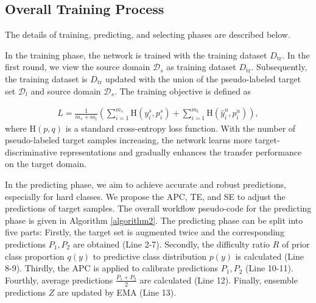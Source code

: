 \documentclass[a4paper,fleqn]{cas-dc}
\begin{document}
	\subsection{Overall Training Process}
	The details of training, predicting, and selecting phases are described below.
	
	In the training phase, the network is trained with the training dataset $D_{\text{tr}}$. In the first round, we view the source domain $\mathcal{D}_{s}$ as training dataset $D_{\text{tr}}$. Subsequently, the training dataset is $D_{\text{tr}}$ updated  with the union of the pseudo-labeled target set $\mathcal{D}_{l}$ and source domain $\mathcal{D}_{s}$. The training objective is defined as
	
	\begin{equation}
		\begin{aligned}
			L = \frac{1}{m_s+ m_t} (\sum_{i=1}^{m_s} \text{H}(y_i^s, p_i^s)+
			\sum_{i=1}^{m_t} \text{H}(\hat y_i^u, p_i^u)),
		\end{aligned}
	\end{equation}
	where $\text{H}(p,q)$ is a standard cross-entropy loss function. With the number of pseudo-labeled target samples increasing, the network learns more target-discriminative representations and gradually enhances the transfer performance on the target domain.
	

	
	In the predicting phase, we aim to achieve accurate and robust predictions, especially for hard classes. We propose the APC, TE, and SE to adjust the predictions of target samples.  The overall workflow pseudo-code for the predicting phase is given in Algorithm \ref{algorithm2}. The predicting phase can be split into five parts: Firstly, the target set is augmented twice and the corresponding predictions $P_1, P_2$  are obtained (Line 2-7). Secondly, the difficulty ratio $R$ of prior class proportion $q(y)$ to predictive class distribution $p(y)$  is calculated (Line 8-9). Thirdly, the APC is applied to calibrate predictions $P_1, P_2$ (Line 10-11). Fourthly, average predictions $\frac{P_1+P_2}{2}$  are calculated (Line 12). Finally, ensemble predictions $Z$ are updated by EMA (Line 13).
	
\end{document}
